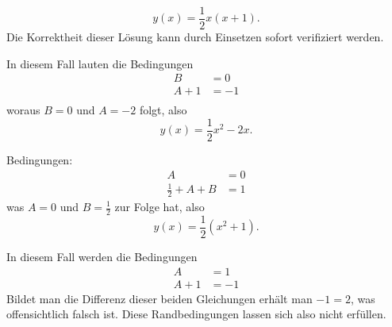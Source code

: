 \begin{loesung}
\begin{teilaufgaben}
\[
y(x)=\frac12x(x+1).
\]
Die Korrektheit dieser Lösung kann durch Einsetzen sofort
verifiziert werden.
\item In diesem Fall lauten die Bedingungen
\begin{align*}
B&=0\\
A+1&=-1\\
\end{align*}
woraus $B=0$ und $A=-2$ folgt, also
\[
y(x)=\frac12x^2-2x.
\]
\item
Bedingungen:
\begin{align*}
A&=0\\
\frac12+A+B&=1
\end{align*}
was $A=0$ und $B=\frac12$ zur Folge hat, also
\[
y(x)=\frac12(x^2+1).
\]
\item In diesem Fall werden die Bedingungen
\begin{align*}
A&=1\\
A+1&=-1
\end{align*}
Bildet man die Differenz dieser beiden Gleichungen
erhält man $-1=2$, was offensichtlich falsch ist. Diese
Randbedingungen lassen sich also nicht erfüllen.
\qedhere
\end{teilaufgaben}
\end{loesung}

